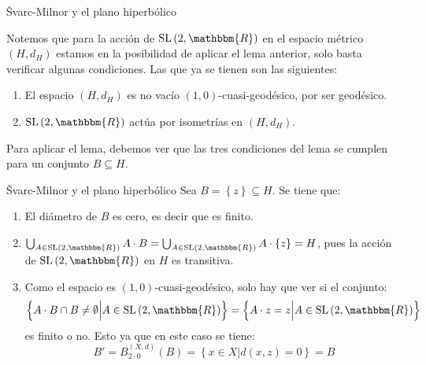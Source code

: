\documentclass[xcolor=dvipsnames]{beamer}
\theoremstyle{largebreak}
\newcommand{\bbm}[1]{\ensuremath{\mathbbm{#1}}}
\newcommand{\SL}[1]{\ensuremath{\textup{SL}\left(#1\right)}}
\begin{document}
\begin{frame}{Švarc-Milnor y el plano hiperbólico}
    \begin{obs}
        Notemos que para la acción de $\SL{2,\bbm{R}}$ en el espacio métrico $(H,d_H)$ estamos en la posibilidad de aplicar el lema anterior, solo basta verificar algunas condiciones. Las que ya se tienen son las siguientes:
        \begin{enumerate}[label = \textit{(\arabic*)}]
            \item El espacio $(H,d_H)$ es no vacío $(1,0)$-cuasi-geodésico, por ser geodésico.
            \item $\SL{2,\bbm{R}}$ actúa por isometrías en $(H,d_H)$.
        \end{enumerate}
        Para aplicar el lema, debemos ver que las tres condiciones del lema se cumplen para un conjunto $B\subseteq H$.
    \end{obs}
\end{frame}

\begin{frame}{Švarc-Milnor y el plano hiperbólico}
    Sea $B=\left\{z\right\}\subseteq H$. Se tiene que:
    \begin{enumerate}[label = \textit{(\arabic*)}]
        \item El diámetro de $B$ es cero, es decir que es finito.
        \item $\bigcup_{A\in\SL{2,\bbm{R}}}A\cdot B=\bigcup_{A\in\SL{2,\bbm{R}}}A\cdot\left\{z\right\}=H$, pues la acción de $\SL{2,\bbm{R}}$ en $H$ es transitiva.
        \item Como el espacio es $(1,0)$-cuasi-geodésico, solo hay que ver si el conjunto:
        \begin{equation*}
            \left\{A\cdot B\cap B\neq\emptyset \Big|A\in\SL{2,\bbm{R}} \right\}=\left\{A\cdot z=z\Big|A\in\SL{2,\bbm{R}} \right\}
        \end{equation*}
        es finito o no. Esto ya que en este caso se tiene:
        \begin{equation*}
            B'=B_{2\cdot 0}^{(X,d)}(B)=\left\{x\in X\Big|d(x,z)=0\right\}=B
        \end{equation*}
    \end{enumerate}
\end{frame}
\end{document}
